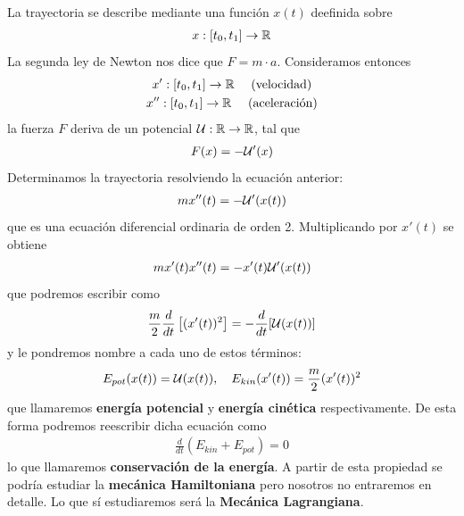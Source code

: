 La trayectoria se describe mediante una función $x(t)$ deefinida sobre
\begin{gather*}
    x:[t_0,t_1] \to \mathbb{R}
\end{gather*}
La segunda ley de Newton nos dice que $F=m\cdot a$. Consideramos entonces 
\begin{gather*}
    x':[t_0,t_1] \to \mathbb{R} \ \ \ \ \text{(velocidad)}\\
    x'':[t_0,t_1] \to \mathbb{R} \ \ \ \ \text{(aceleración)}
\end{gather*}
la fuerza $F$ deriva de un potencial $\mathcal{U}:\mathbb{R} \to \mathbb{R}$, tal que 
\begin{gather*}
    F(x) = -\mathcal{U}'(x)
\end{gather*}
Determinamos la trayectoria resolviendo la ecuación anterior:
\begin{gather*}
    mx''(t) = -\mathcal{U}'(x(t))
\end{gather*}
que es una ecuación diferencial ordinaria de orden 2. Multiplicando por $x'(t)$ se obtiene
\begin{gather*}
    mx'(t)x''(t) = -x'(t) \mathcal{U}'(x(t))
\end{gather*}
que podremos escribir como 
\begin{gather*}
    \frac{m}{2} \frac{d}{dt}\left[ (x'(t))^2 \right] = -\frac{d}{dt}[\mathcal{U}(x(t))]
\end{gather*}
y le pondremos nombre a cada uno de estos términos:
\begin{gather*}
    E_{pot}(x(t)) = \mathcal{U}(x(t)),\ \ \ E_{kin}(x'(t)) = \frac{m}{2}(x'(t))^2
\end{gather*}
que llamaremos \textbf{energía potencial} y \textbf{energía cinética} respectivamente. De esta forma podremos reescribir dicha ecuación como 
\begin{gather*}
    \frac{d}{dt}(E_{kin} + E_{pot}) = 0
\end{gather*}
lo que llamaremos \textbf{conservación de la energía}. A partir de esta propiedad se podría estudiar la \textbf{mecánica Hamiltoniana} pero nosotros no entraremos en detalle. Lo que sí estudiaremos será la \textbf{Mecánica Lagrangiana}.\\

